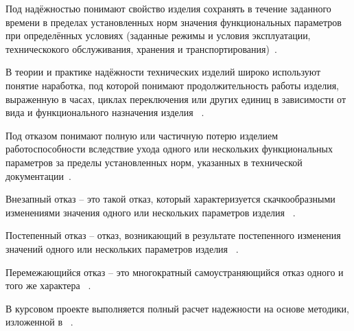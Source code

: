 Под надёжностью понимают свойство изделия сохранять в течение
заданного времени в пределах установленных норм значения
функциональных параметров при определённых условиях (заданные режимы и
условия эксплуатации, техническокого обслуживания, хранения и
транспортирования)~\cite{Borovikov2010}.

В теории и практике надёжности технических изделий широко используют
понятие наработка, под которой понимают продолжительность работы
изделия, выраженную в часах, циклах переключения или других единиц в
зависимости от вида и функционального назначения изделия ~\cite{Borovikov2010}.

Под отказом понимают полную или частичную потерю изделием
работоспособности вследствие ухода одного или нескольких
функциональных параметров за пределы установленных норм, указанных в
технической документации~\cite{Borovikov2010}.

Внезапный отказ – это такой отказ, который характеризуется
скачкообразными изменениями значения одного или нескольких параметров
изделия ~\cite{Borovikov2010}.

Постепенный отказ – отказ, возникающий в результате
постепенного изменения значений одного или нескольких параметров
изделия ~\cite{Borovikov2010}.

Перемежающийся отказ – это многократный самоустраняющийся
отказ одного и того же характера ~\cite{Borovikov2010}.

В курсовом проекте выполняется полный расчет надежности на основе
методики, изложенной в ~\cite{Borovikov2010}.


